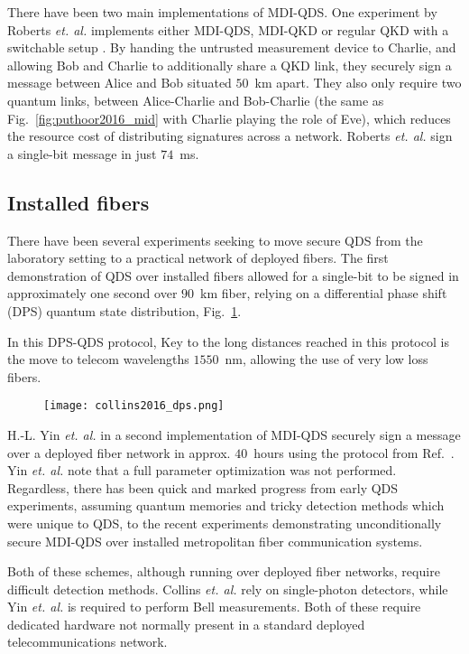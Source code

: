 There have been two main implementations of MDI-QDS. One experiment by Roberts \emph{et. al.} implements either MDI-QDS, MDI-QKD or regular QKD with a switchable setup \cite{Roberts2017}. By handing the untrusted measurement device to Charlie, and allowing Bob and Charlie to additionally share a QKD link, they securely sign a message between Alice and Bob situated $50$~km apart. They also only require two quantum links, between Alice-Charlie and Bob-Charlie (the same as Fig.~\ref{fig:puthoor2016_mid} with Charlie playing the role of Eve), which reduces the resource cost of distributing signatures across a network. Roberts \emph{et. al.} sign a single-bit message in just $74$~ms. 



\subsection*{Installed fibers}
There have been several experiments seeking to move secure QDS from the laboratory setting to a practical network of deployed fibers. The first demonstration of QDS over installed fibers allowed for a single-bit to be signed in approximately one second over $90$~km fiber, relying on a differential phase shift (DPS) quantum state distribution, Fig.~\ref{fig:collins2016_dps}.

In this DPS-QDS protocol,  
Key to the long distances reached in this protocol is the move to telecom wavelengths $1550$~nm, allowing the use of very low loss fibers. 

\begin{figure}[htp]
\centering
\texttt{[image: collins2016\_dps.png]}
\caption{\label{fig:collins2016_dps}}
\end{figure}


H.-L. Yin \emph{et. al.} in a second implementation of MDI-QDS \cite{Yin2017} securely sign a message over a deployed fiber network in approx. $40$~hours using the protocol from Ref.~\cite{Puthoor2016}. Yin \emph{et. al.} note that a full parameter optimization was not performed. Regardless, there has been quick and marked progress from early QDS experiments, assuming quantum memories and tricky detection methods which were unique to QDS, to the recent experiments demonstrating unconditionally secure MDI-QDS over installed metropolitan fiber communication systems.

Both of these schemes, although running over deployed fiber networks, require difficult detection methods. Collins \emph{et. al.} \cite{Collings2016} rely on single-photon detectors, while Yin \emph{et. al.} \cite{Yin2017} is required to perform Bell measurements. Both of these require dedicated hardware not normally present in a standard deployed telecommunications network.






